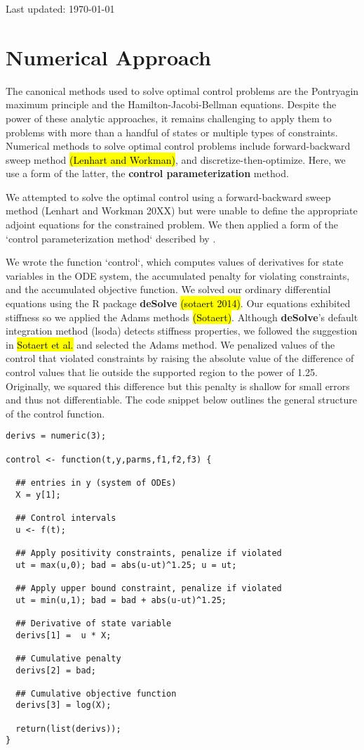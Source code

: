 \documentclass[12pt, oneside]{article}   	%
\begin{document}
 

   	Last updated: \today

\section*{Numerical Approach}

The canonical methods used to solve optimal control problems are the Pontryagin maximum principle and the Hamilton-Jacobi-Bellman equations. Despite the power of these analytic approaches, it remains challenging to apply them to problems with more than a handful of states or multiple types of constraints. Numerical methods to solve optimal control problems include forward-backward sweep method \hl{(Lenhart and Workman)}, and discretize-then-optimize. Here, we use a form of the latter, the \textbf{control parameterization} method. 

We attempted to solve the optimal control using a forward-backward sweep method (Lenhart and Workman 20XX) but were unable to define the appropriate adjoint equations for the constrained problem. We then applied a form of the `control parameterization method` described by \cite{lin2014}.

We wrote the function `control`, which computes values of derivatives for state variables in the ODE system, the accumulated penalty for violating constraints, and the accumulated objective function. We solved our ordinary differential equations using the R package \textbf{deSolve} \hl{(sotaert 2014)}. Our equations exhibited stiffness so we applied the Adams methods \hl{(Sotaert)}. Although \textbf{deSolve}'s default integration method (lsoda) detects stiffness properties, we followed the suggestion in \hl{Sotaert et al.} and selected the Adams method. We penalized values of the control that violated constraints by raising the absolute value of the difference of control values that lie outside the supported region to the power of 1.25. Originally, we squared this difference but this penalty is shallow for small errors and thus not differentiable. The code snippet below outlines the general structure of the control function.

\begin{lstlisting}
derivs = numeric(3);

control <- function(t,y,parms,f1,f2,f3) {
  
  ## entries in y (system of ODEs)
  X = y[1];
  
  ## Control intervals
  u <- f(t);
  
  ## Apply positivity constraints, penalize if violated
  ut = max(u,0); bad = abs(u-ut)^1.25; u = ut;
  
  ## Apply upper bound constraint, penalize if violated
  ut = min(u,1); bad = bad + abs(u-ut)^1.25; 
  
  ## Derivative of state variable
  derivs[1] =  u * X;
  
  ## Cumulative penalty
  derivs[2] = bad;
  
  ## Cumulative objective function
  derivs[3] = log(X);
  
  return(list(derivs));
}

\end{lstlisting}
\end{document}

